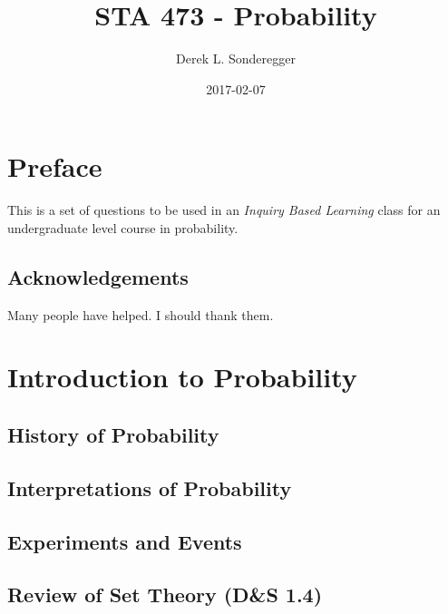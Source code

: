 \documentclass[]{book}
\title{STA 473 - Probability}
\author{Derek L. Sonderegger}
\date{2017-02-07}
\begin{document}
\maketitle

{
\setcounter{tocdepth}{1}
\tableofcontents
}
\chapter*{Preface}\label{preface}

This is a set of questions to be used in an \emph{Inquiry Based
Learning} class for an undergraduate level course in probability.

\section*{Acknowledgements}\label{acknowledgements}

Many people have helped. I should thank them.

\chapter{Introduction to Probability}\label{introduction-to-probability}

\section{History of Probability}\label{history-of-probability}

\section{Interpretations of
Probability}\label{interpretations-of-probability}

\section{Experiments and Events}\label{experiments-and-events}

\section{Review of Set Theory (D\&S
1.4)}\label{review-of-set-theory-ds-1.4}
\end{document}
